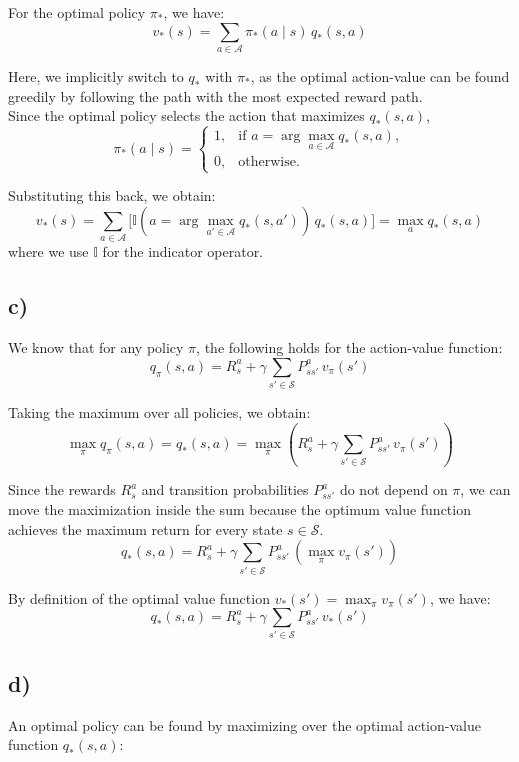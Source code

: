 \documentclass[11pt]{article}
\begin{document}
For the optimal policy $\pi_{*}$, we have:
\[
v_{*}(s) = \sum_{a \in \mathcal{A}} \pi_{*}(a \mid s) \, q_{*}(s, a)
\]

Here, we implicitly switch to $q_{*}$ with $\pi_{*}$, as the optimal action-value can be found greedily by following the path with the most expected reward path. \\

Since the optimal policy selects the action that maximizes $q_{*}(s,a)$,
\[
\pi_{*}(a \mid s) =
\begin{cases}
1, & \text{if } a = \arg\max\limits_{a \in \mathcal{A}} q_{*}(s,a), \\[4pt]
0, & \text{otherwise.}
\end{cases}
\]

Substituting this back, we obtain:
\[
v_{*}(s)
= \sum_{a \in \mathcal{A}}
\Big[ \mathbb{I}\!\left( a = \arg\max\limits_{a' \in \mathcal{A}} q_{*}(s,a') \right) 
\, q_{*}(s,a)\Big]
= \max_{a} q_{*}(s,a) 
\]
where we use $\mathbb{I}$ for the indicator operator.

\subsection*{c)}
We know that for any policy $\pi$, the following holds for the action-value function:
\[
q_{\pi}(s,a) = R_s^a + \gamma \sum_{s' \in \mathcal{S}} P_{ss'}^a \, v_{\pi}(s')
\]

Taking the maximum over all policies, we obtain:
\[
\max_{\pi} q_{\pi}(s,a) = q_{*}(s,a) = 
\max_{\pi} \left( R_s^a + \gamma \sum_{s' \in \mathcal{S}} P_{ss'}^a \, v_{\pi}(s') \right)
\]

Since the rewards $R_s^a$ and transition probabilities $P_{ss'}^a$ do not depend on $\pi$, we can move the maximization inside the sum because the optimum value function achieves the maximum return for every state $s \in \mathcal{S}$.
\[
q_{*}(s,a) = R_s^a + \gamma \sum_{s' \in \mathcal{S}} P_{ss'}^a \, \left( \max_{\pi} v_{\pi}(s') \right)
\]

By definition of the optimal value function $v_{*}(s') = \max_{\pi} v_{\pi}(s')$, we have:
\[
\boxed{
q_{*}(s,a) = R_s^a + \gamma \sum_{s' \in \mathcal{S}} P_{ss'}^a \, v_{*}(s')
}
\]

\subsection*{d)}
An optimal policy can be found by maximizing over the optimal action-value function $q_{*}(s,a)$:
\end{document}
